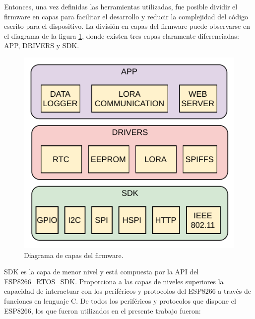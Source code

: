 Entonces, una vez definidas las herramientas utilizadas, fue posible dividir el firmware en capas para facilitar el desarrollo y reducir la complejidad del código escrito para el dispositivo. La división en capas del firmware puede observarse en el diagrama de la figura \ref{fig:firmwareLayers}, donde existen tres capas claramente diferenciadas: APP, DRIVERS y SDK.

\begin{figure}[h]
	\centering
	\includegraphics[scale=1]{./Figures/firmware_layers.pdf}
	\caption{Diagrama de capas del firmware.}
		\label{fig:firmwareLayers}
\end{figure}

SDK es la capa de menor nivel y está compuesta por la API del ESP8266\_RTOS\_SDK. Proporciona a las capas de niveles superiores la capacidad de interactuar con los periféricos y protocolos del ESP8266 a través de funciones en lenguaje C. De todos los periféricos y protocolos que dispone el ESP8266, los que fueron utilizados en el presente trabajo fueron:

